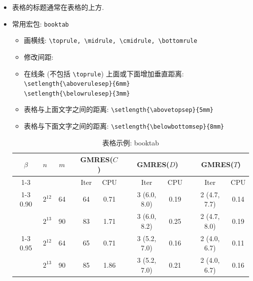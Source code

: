 \documentclass[openany]{MathematicalModelCaseStudyReport}  %
\numberwithin{algorithm}{chapter}
\begin{document}
\begin{itemize}
  \item 表格的标题通常在表格的上方.
  \item 常用宏包: \Verb|booktab|
  \begin{itemize}
    \item 画横线: \Verb|\toprule, \midrule, \cmidrule, \bottomrule|
    \item 修改间距:
    \item[] 在线条 (不包括 \Verb|\toprule|) 上面或下面增加垂直距离: \\
       \hspace*{2em}\Verb|\setlength{\aboverulesep}{6mm}|\\
       \hspace*{2em}\Verb|\setlength{\belowrulesep}{3mm}|
    \item[] 表格与上面文字之间的距离: \Verb|\setlength{\abovetopsep}{5mm}|
    \item[] 表格与下面文字之间的距离: \Verb|\setlength{\belowbottomsep}{8mm}|
  \end{itemize}

\begin{table}[H]
\begin{center}
\caption{表格示例: booktab \label{Tab:1}}
\begin{tabular}{clc*{3}{ccc}}\toprule
  $\beta$   & $n$ & $m$
  && \multicolumn{2}{c}{GMRES($C$)}
  && \multicolumn{2}{c}{GMRES($D$)}
  && \multicolumn{2}{c}{GMRES($T$)} \\ \cmidrule{1-3}\cmidrule{5-6}\cmidrule{8-9}\cmidrule{11-12}
  &         &    && Iter &  CPU && Iter         &  CPU   && Iter         & CPU      \\
  \cmidrule{1-3}\cmidrule{5-6}\cmidrule{8-9}\cmidrule{11-12}
  0.90
  &$2^{12}$ & 64 && 64 &   0.71 &&  3 (6.0, 8.0) &   0.19 &&  2 (4.7, 7.7) &   0.14 \\
  &$2^{13}$ & 90 && 83 &   1.71 &&  3 (6.0, 8.2) &   0.25 &&  2 (4.7, 8.0) &   0.19 \\
  \cmidrule{1-3}\cmidrule{5-6}\cmidrule{8-9}\cmidrule{11-12}
  0.95
  &$2^{12}$ & 64 && 65 &   0.71 &&  3 (5.2, 7.0) &   0.16 &&  2 (4.0, 6.7) &   0.11 \\
  &$2^{13}$ & 90 && 85 &   1.86 &&  3 (5.2, 7.0) &   0.21 &&  2 (4.0, 6.7) &   0.16 \\
  \bottomrule
\end{tabular}
\end{center}
\end{table}



\end{itemize}
\end{document}
